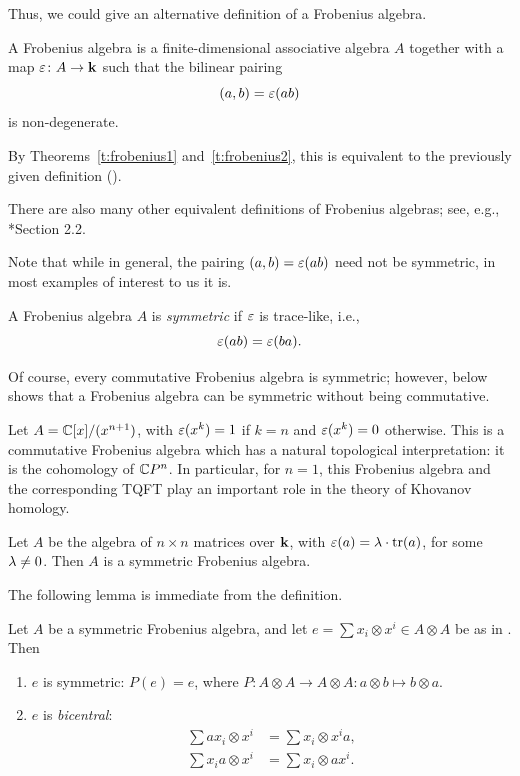 Thus, we could give an alternative definition of a Frobenius algebra.
\begin{definition}\label{d:frobenius2}
  A Frobenius algebra is a finite-dimensional associative algebra
  $A$ together with a map $\varepsilon \colon A\to \mathbf{k}$ such that the
  bilinear pairing
  \begin{equation}\label{e:frob_pairing}
    (a,b) = \varepsilon(ab)
  \end{equation}
  is non-degenerate.
\end{definition}
By Theorems~\ref{t:frobenius1} and~\ref{t:frobenius2}, this is equivalent to the
previously given definition ().

There are also many other equivalent definitions of Frobenius
algebras; see, e.g., *{Section 2.2}.

Note that while in general, the pairing $(a,b) = \varepsilon(ab)$ need not
be symmetric, in most examples of interest to us it is.
\begin{definition}\label{d:frobenius_symmetric}
  A Frobenius algebra $A$ is \emph{symmetric} if $\varepsilon$ is trace-like, i.e.,
  $$
    \varepsilon(ab)=\varepsilon(ba).
  $$
\end{definition}
Of course, every commutative Frobenius algebra is symmetric;
however,  below shows that a Frobenius algebra can be
symmetric without being commutative.

\begin{example}\label{x:frobenius1}
  Let $A=\mathbb{C}[x]/(x^{n+1})$, with $\varepsilon(x^k)=1$ if $k=n$ and
  $\varepsilon(x^k)=0$ otherwise. This is a commutative Frobenius algebra which
  has a natural topological interpretation: it is the cohomology of
  $\mathbb{C} P^n$. In particular, for $n=1$, this Frobenius algebra and the
  corresponding TQFT play an important role in the theory of Khovanov
  homology.
\end{example}
\begin{example} \label{x:frobenius2}
  Let $A$ be the algebra of $n\times n$ matrices over $\mathbf{k}$,
  with $\varepsilon(a)=\lambda\cdot\operatorname{tr}(a)$, for some $\lambda\ne 0$. Then $A$
  is a symmetric Frobenius algebra.
\end{example}

The following lemma is immediate from the definition.
\begin{lemma}\label{l:bicentral}
  Let $A$ be a symmetric Frobenius algebra, and let
  $e=\sum x_i\otimes x^i\in A\otimes A$ be as in . Then
  \begin{enumerate}
    \item $e$ is symmetric: $P(e)=e$, where $P\colon A\otimes A\to A\otimes
    A\colon a\otimes b\mapsto b\otimes a$.
    \item $e$ is \emph{bicentral}:
    \begin{align*}
      \sum ax_i\otimes x^i&=\sum x_i\otimes x^i a,\\
      \sum x_ia\otimes x^i&=\sum x_i\otimes ax^i.
      \end{align*}
    \end{enumerate}
\end{lemma}
